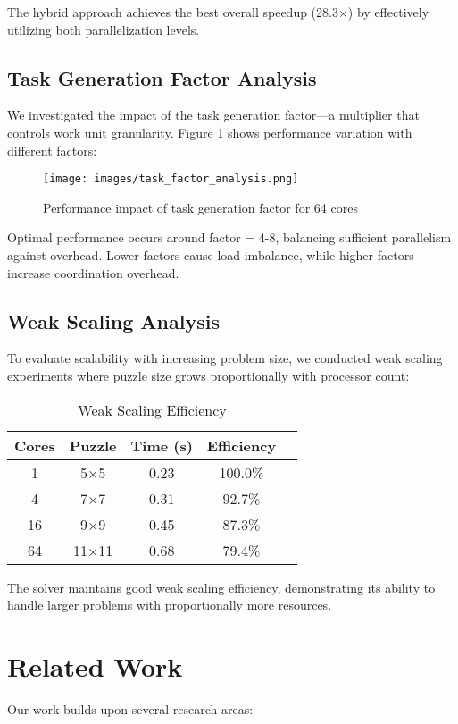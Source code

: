 \documentclass[10pt, conference]{IEEEtran}
\begin{document}
The hybrid approach achieves the best overall speedup (28.3×) by effectively utilizing both parallelization levels.

\subsection{Task Generation Factor Analysis}
We investigated the impact of the task generation factor—a multiplier that controls work unit granularity. Figure \ref{fig:task_factor} shows performance variation with different factors:

\begin{figure}[htbp]
\centering
\texttt{[image: images/task\_factor\_analysis.png]}
\caption{Performance impact of task generation factor for 64 cores}
\label{fig:task_factor}
\end{figure}

Optimal performance occurs around factor = 4-8, balancing sufficient parallelism against overhead. Lower factors cause load imbalance, while higher factors increase coordination overhead.

\subsection{Weak Scaling Analysis}
To evaluate scalability with increasing problem size, we conducted weak scaling experiments where puzzle size grows proportionally with processor count:

\begin{table}[htbp]
\caption{Weak Scaling Efficiency}
\begin{center}
\begin{tabular}{@{}ccccc@{}}
\toprule
\textbf{Cores} & \textbf{Puzzle} & \textbf{Time (s)} & \textbf{Efficiency} \\
\midrule
1 & 5×5 & 0.23 & 100.0\% \\
4 & 7×7 & 0.31 & 92.7\% \\
16 & 9×9 & 0.45 & 87.3\% \\
64 & 11×11 & 0.68 & 79.4\% \\
\bottomrule
\end{tabular}
\end{center}
\label{tab:weak_scaling}
\end{table}

The solver maintains good weak scaling efficiency, demonstrating its ability to handle larger problems with proportionally more resources.

\section{Related Work}
Our work builds upon several research areas:
\end{document}
